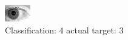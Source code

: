 \begin{figure}[h!]
\begin{center}
\includegraphics[width=0.60\columnwidth]{figures/ID257_class_4_target_3.png}
\end{center}
\caption{ Classification: 4 actual target: 3}
\label{fig:ID257_class_4_target_3}
\end{figure}
